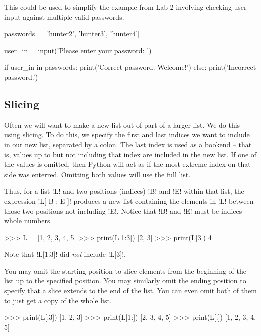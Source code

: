\documentclass[11pt]{cselabheader}
\begin{document}
This could be used to simplify the example from Lab 2 involving checking user
input against multiple valid passwords.

\begin{python3code}
passwords = ['hunter2', 'hunter3', 'hunter4']

user_in = input('Please enter your password: ')

if user_in in passwords:
    print('Correct password. Welcome!')
else:
    print('Incorrect password.')
\end{python3code}

\subsection{Slicing}
Often we will want to make a new list out of part of a larger list. We do this
using slicing. To do this, we specify the first and last indices we want to
include in our new list, separated by a colon. The last index is used as a
bookend -- that is, values up to but not including that index are included in
the new list. If one of the values is omitted, then Python will act as if the
most extreme index on that side was enterred. Omitting both values will use the
full list.

Thus, for a list \pythoninline!L! and two positions (indices) \pythoninline!B! and
\pythoninline!E! within that list, the expression \pythoninline!L[ B : E ]! produces a
new list containing the elements in \pythoninline!L! between those two positions
not including \pythoninline!E!. Notice that \pythoninline!B! and \pythoninline!E! must be
indices -- whole numbers.

\begin{pyconcode}
>>> L = [1, 2, 3, 4, 5]
>>> print(L[1:3])
[2, 3]
>>> print(L[3])
4
\end{pyconcode}

Note that \pythoninline!L[1:3]! did \emph{not} include \pythoninline!L[3]!. 

You may omit the starting position to slice elements from the beginning of the
list up to the specified position. You may similarly omit the ending position to
specify that a slice extends to the end of the list. You can even omit both of
them to just get a copy of the whole list.

\begin{pyconcode}
>>> print(L[:3])
[1, 2, 3]
>>> print(L[1:])
[2, 3, 4, 5]
>>> print(L[:])
[1, 2, 3, 4, 5]
\end{pyconcode}
\end{document}
